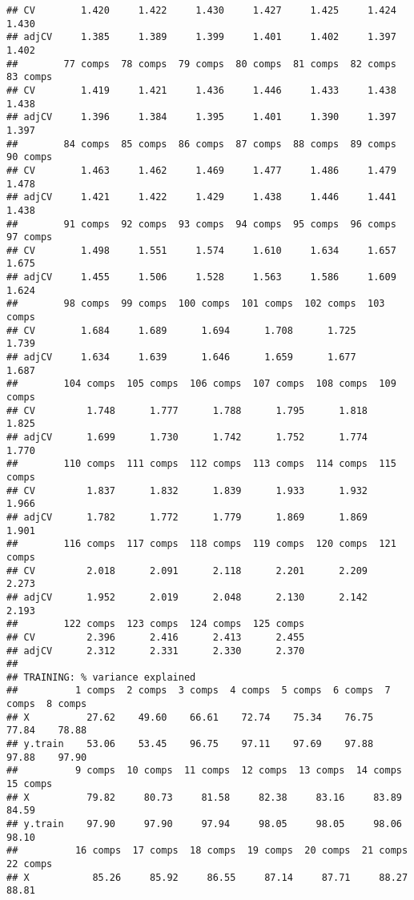\documentclass[
]{article}
\begin{document}
\begin{verbatim}
## CV        1.420     1.422     1.430     1.427     1.425     1.424     1.430
## adjCV     1.385     1.389     1.399     1.401     1.402     1.397     1.402
##        77 comps  78 comps  79 comps  80 comps  81 comps  82 comps  83 comps
## CV        1.419     1.421     1.436     1.446     1.433     1.438     1.438
## adjCV     1.396     1.384     1.395     1.401     1.390     1.397     1.397
##        84 comps  85 comps  86 comps  87 comps  88 comps  89 comps  90 comps
## CV        1.463     1.462     1.469     1.477     1.486     1.479     1.478
## adjCV     1.421     1.422     1.429     1.438     1.446     1.441     1.438
##        91 comps  92 comps  93 comps  94 comps  95 comps  96 comps  97 comps
## CV        1.498     1.551     1.574     1.610     1.634     1.657     1.675
## adjCV     1.455     1.506     1.528     1.563     1.586     1.609     1.624
##        98 comps  99 comps  100 comps  101 comps  102 comps  103 comps
## CV        1.684     1.689      1.694      1.708      1.725      1.739
## adjCV     1.634     1.639      1.646      1.659      1.677      1.687
##        104 comps  105 comps  106 comps  107 comps  108 comps  109 comps
## CV         1.748      1.777      1.788      1.795      1.818      1.825
## adjCV      1.699      1.730      1.742      1.752      1.774      1.770
##        110 comps  111 comps  112 comps  113 comps  114 comps  115 comps
## CV         1.837      1.832      1.839      1.933      1.932      1.966
## adjCV      1.782      1.772      1.779      1.869      1.869      1.901
##        116 comps  117 comps  118 comps  119 comps  120 comps  121 comps
## CV         2.018      2.091      2.118      2.201      2.209      2.273
## adjCV      1.952      2.019      2.048      2.130      2.142      2.193
##        122 comps  123 comps  124 comps  125 comps
## CV         2.396      2.416      2.413      2.455
## adjCV      2.312      2.331      2.330      2.370
## 
## TRAINING: % variance explained
##          1 comps  2 comps  3 comps  4 comps  5 comps  6 comps  7 comps  8 comps
## X          27.62    49.60    66.61    72.74    75.34    76.75    77.84    78.88
## y.train    53.06    53.45    96.75    97.11    97.69    97.88    97.88    97.90
##          9 comps  10 comps  11 comps  12 comps  13 comps  14 comps  15 comps
## X          79.82     80.73     81.58     82.38     83.16     83.89     84.59
## y.train    97.90     97.90     97.94     98.05     98.05     98.06     98.10
##          16 comps  17 comps  18 comps  19 comps  20 comps  21 comps  22 comps
## X           85.26     85.92     86.55     87.14     87.71     88.27     88.81

\end{verbatim}
\end{document}
